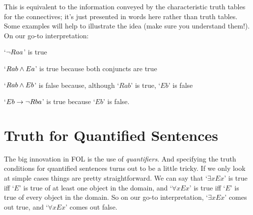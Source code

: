 This  is equivalent to the information conveyed by the characteristic truth tables for the connectives; it's just presented in words here rather than truth tables.   Some examples will help to illustrate the idea (make sure you understand them!). On our go-to interpretation:
	\begin{earg}
		\item[\textbullet]  `$\neg Raa$' is true
		\item[\textbullet] `$Rab \wedge Ea$' is true because both conjuncts are true
		\item[\textbullet] `$Rab \wedge Eb$' is false because, although `$Rab$' is true, `$Eb$' is false
		\item[\textbullet] `$Eb \rightarrow \neg Rba$' is true because `$Eb$' is false.
		\end{earg}

\section{Truth for Quantified Sentences}\label{s:TruthQuantifiedSentences}

The big innovation in FOL is the use of \emph{quantifiers}. And specifying the truth conditions for quantified sentences turns out to be a little tricky.  If we only look at simple cases things are pretty straightforward.  We can say that `$\exists xEx$' is true iff `$E$' is true of at least one object in the domain, and  `$\forall xEx$' is true iff `$E$' is true of every object in the domain.  So on our go-to interpretation, `$\exists xEx$' comes out true, and `$\forall xEx$' comes out false.


